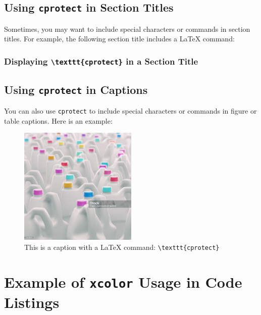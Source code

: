 \documentclass[]{article}
\begin{document}
\cprotect\subsection{Using \texorpdfstring{\protect\texttt{cprotect}}{cprotect} in Section Titles}

Sometimes, you may want to include special characters or commands in section titles. For example, the following section title includes a LaTeX command:

\cprotect\subsubsection{Displaying \protect\texttt{\textbackslash texttt\{cprotect\}} in a Section Title}

\cprotect\subsection{Using \protect\texttt{cprotect} in Captions}

You can also use \texttt{cprotect} to include special characters or commands in figure or table captions. Here is an example:

\begin{figure}[!ht]
    \centering
    \includegraphics[width=0.5\textwidth]{assets/example-image.jpg}
    \cprotect\caption{This is a caption with a LaTeX command: \texttt{\textbackslash texttt\{cprotect\}}}
\end{figure}

\section{Example of \texorpdfstring{\texttt{xcolor}}{xcolor} Usage in Code Listings}
\end{document}
